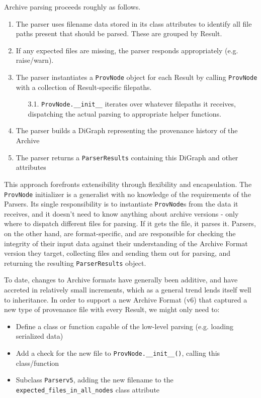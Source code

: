 Archive parsing proceeds roughly as follows.
\begin{enumerate}
    \item The parser uses filename data stored in its class attributes to identify all file paths present that should be parsed. These are grouped by Result.
    \item If any expected files are missing, the parser responds appropriately (e.g. raise/warn).
    \item The parser instantiates a \texttt{ProvNode} object for each Result by calling \texttt{ProvNode} with a collection of Result-specific filepaths.
    \begin{enumerate}
        \item[3.1.]\texttt{ProvNode.\_\_init\_\_} iterates over whatever filepaths it receives, dispatching the actual parsing to appropriate helper functions. 
    \end{enumerate}
    \item The parser builds a DiGraph representing the provenance history of the Archive
    \item The parser returns a \texttt{ParserResults} containing this DiGraph and other attributes
\end{enumerate}

This approach forefronts extensibility through flexibility and encapsulation.
The \texttt{ProvNode} initializer is a generalist with no knowledge of the requirements
of the Parsers. Its single responsibility is to instantiate \texttt{ProvNode}s from the
data it receives, and it doesn’t need to know anything about archive versions -
only where to dispatch different files for parsing. If it gets the file, it
parses it. Parsers, on the other hand, are format-specific, and are responsible
for checking the integrity of their input data against their understanding of
the Archive Format version they target, collecting files and sending them out
for parsing, and returning the resulting \texttt{ParserResults} object.

To date, changes to Archive formats have generally been additive, and have
accreted in relatively small increments, which as a general trend lends itself
well to inheritance. In order to support a new Archive Format (v6) that captured
a new type of provenance file with every Result, we might only need to:
\begin{itemize}
    \item Define a class or function capable of the low-level parsing (e.g. loading serialized data)
    \item Add a check for the new file to \texttt{ProvNode.\_\_init\_\_()}, calling this class/function
    \item Subclass \texttt{Parserv5}, adding the new filename to the \texttt{expected\_files\_in\_all\_nodes} class attribute
\end{itemize}

